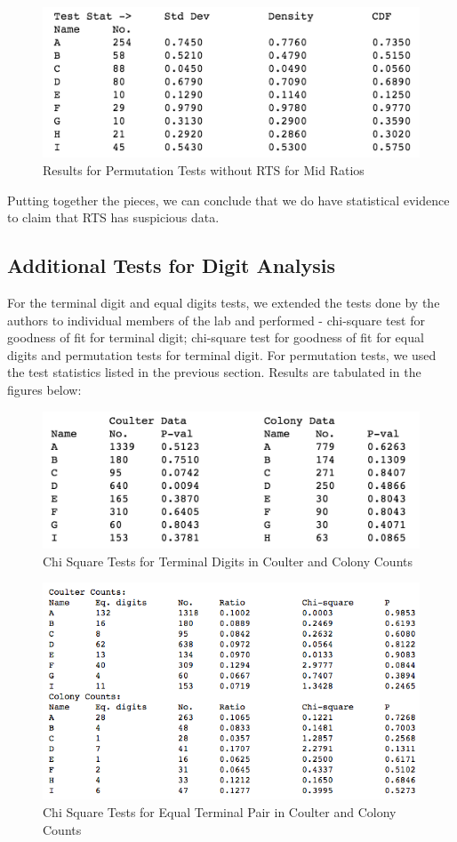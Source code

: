 \documentclass{article}
\begin{document}
\begin{figure}[H]
\centering
\includegraphics[width=0.8\linewidth]{images/mid_ratio_perm_no_rts.png}
\caption{Results for Permutation Tests without RTS  for Mid Ratios}
\end{figure}

Putting together the pieces, we can conclude that we do have statistical evidence to claim that RTS has suspicious data.

    \subsection{Additional Tests for Digit
Analysis}\label{additional-tests-for-digit-analysis}

For the terminal digit and equal digits tests, we extended the tests done by
the authors to individual members of the lab and performed - chi-square test for goodness of fit for terminal digit; chi-square test for goodness of fit for equal digits and permutation tests for terminal digit. For permutation tests, we used the test statistics listed in the previous section. Results are tabulated in the figures below:

\begin{figure}[H]
\centering
\includegraphics[width=0.7\linewidth]{images/raaz_term_chi_summary.png}
\caption{Chi Square Tests for Terminal Digits in Coulter and Colony
Counts}
\label{cst1}
\end{figure}

\begin{figure}[H]
\centering
\includegraphics[width=0.9\linewidth]{images/raaz_eq_chi_elaborate.png}
\caption{Chi Square Tests for Equal Terminal Pair in Coulter and Colony
Counts}
\label{cst2}
\end{figure}
\end{document}
